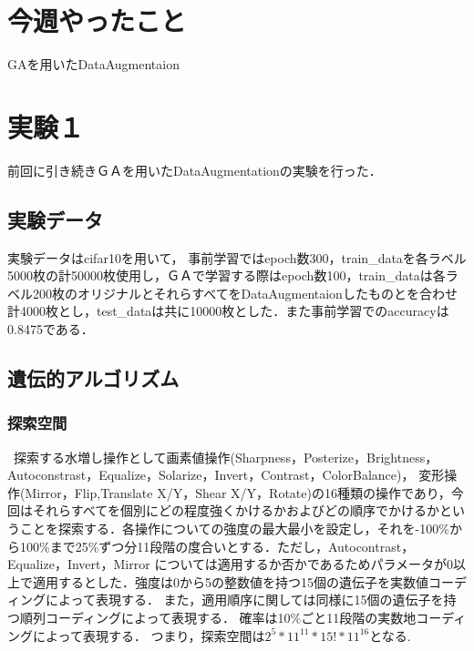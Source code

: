 \documentclass[twocolumn]{jarticle}     %
\begin{document}

\section{今週やったこと}
 GAを用いたDataAugmentaion

\section{実験１}
前回に引き続きＧＡを用いたDataAugmentationの実験を行った．\\

\subsection{実験データ}
実験データはcifar10を用いて，
事前学習ではepoch数300，train\_dataを各ラベル5000枚の計50000枚使用し，ＧＡで学習する際はepoch数100，train\_dataは各ラベル200枚のオリジナルとそれらすべてをDataAugmentaionしたものとを合わせ計4000枚とし，test\_dataは共に10000枚とした．また事前学習でのaccuracyは0.8475である．
\subsection{遺伝的アルゴリズム}


\subsubsection{探索空間}
\ 探索する水増し操作として画素値操作(Sharpness，Posterize，Brightness，Autoconstrast，Equalize，Solarize，Invert，Contrast，ColorBalance)，
変形操作(Mirror，Flip,Translate X/Y，Shear X/Y，Rotate)の16種類の操作であり，今回はそれらすべてを個別にどの程度強くかけるかおよびどの順序でかけるかということを探索する．各操作についての強度の最大最小を設定し，それを-100\%から100\%まで25\%ずつ分11段階の度合いとする．ただし，Autocontrast，Equalize，Invert，Mirror については適用するか否かであるためパラメータが0以上で適用するとした．強度は0から5の整数値を持つ15個の遺伝子を実数値コーディングによって表現する．
また，適用順序に関しては同様に15個の遺伝子を持つ順列コーディングによって表現する．
確率は10\%ごと11段階の実数地コーディングによって表現する．
つまり，探索空間は$2^5*11^{11}*15!*11^{16}$となる.
\end{document}
